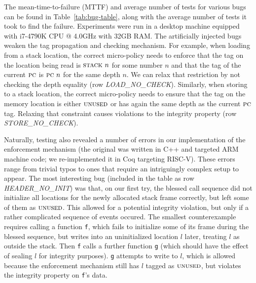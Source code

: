 \documentclass[acmsmall,review,anonymous]{acmart}\settopmatter{printfolios=true,printccs=false,printacmref=false}
\begin{document}
{{The mean-time-to-failure (MTTF) and average number of tests for various bugs can be found in
Table~\ref{tab:bug-table}, along with the average number of tests
it took to find the failure. Experiments were run in a desktop
machine equipped with i7-4790K CPU @ 4.0GHz with 32GB RAM.
%
The artificially injected bugs weaken the tag propagation
and checking mechanism.
%
For example, when loading from a stack location, the correct
micro-policy needs to enforce that the tag on the location being read
is $\textsc{stack} ~ n$ for some number $n$ and that the tag of the
current $\textsc{pc}$ is $\textsc{pc} ~ n$ for the same depth $n$. We can relax
that restriction by not checking the depth equality (row {\em
  LOAD\_NO\_CHECK}).
%
Similarly, when storing to a stack location, the correct micro-policy
needs to ensure that the tag on the memory location is either
$\textsc{unused}$ or has again the same depth as the current $\textsc{pc}$
tag. Relaxing that constraint causes violations to the integrity
property (row {\em STORE\_NO\_CHECK}).

Naturally, testing also revealed a number of errors in our
implementation of the enforcement mechanism (the original was written in C++
and targeted ARM machine code;
we re-implemented it in Coq targeting RISC-V).  These errors range
from trivial typos to ones that require an intriguingly complex setup
to appear.  The most interesting bug (included in the table as row
{\em HEADER\_NO\_INIT}) was that, on our first try, the blessed call
sequence %
did not initialize all locations for the
newly allocated stack frame correctly, but left some of them as
$\textsc{unused}$. This allowed for a potential integrity violation, but
only if a rather complicated sequence of events occured.
The smallest counterexample requires calling a function {\tt f},
which fails to initialize some of its frame during the blessed sequence,
but writes into an uninitialized location $l$ later, treating \(l\) as outside
the stack. Then {\tt f} calls a further function {\tt g} (which should have
the effect of sealing $l$ for integrity purposes). {\tt g} attempts to write to $l$,
which is allowed because the enforcement mechanism still has
$l$ tagged as $\textsc{unused}$, but violates the integrity property on {\tt f}'s data.


}}
\end{document}
